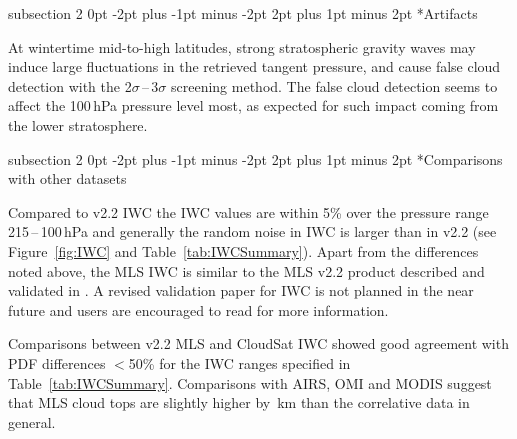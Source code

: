 \documentclass[11pt,draft]{report}
\makeatletter
\renewcommand{\subsection}{\@startsection%
  {subsection}%
  {2}%
  {0pt}%
  {-2pt plus -1pt minus -2pt}%
  {2pt plus 1pt minus 2pt}%
  {\large\sffamily\fontseries{sb}\selectfont\flushleft\color{SectionColor}\figureversion{tabular}}}%
\makeatother
\begin{document}
\subsection*{Artifacts}

At wintertime mid-to-high latitudes, strong stratospheric gravity waves
may induce large fluctuations in the retrieved tangent pressure, and
cause false cloud detection with the 2$\sigma$\,--\,3$\sigma$ screening
method. The false cloud detection seems to affect the 100\,hPa pressure
level most, as expected for such impact coming from the lower
stratosphere.

\subsection*{Comparisons with other datasets}

Compared to v2.2 IWC the \thisv IWC values are within 5\% over the
pressure range 215\,--\,100\,hPa and generally the random noise in
\thisv IWC is larger than in v2.2 (see Figure~\ref{fig:IWC} and
Table~\ref{tab:IWCSummary}).  Apart from the differences noted above,
the MLS \thisv IWC is similar to the MLS v2.2 product described and
validated in \citet{WuEtal08}.  A revised validation paper for IWC is
not planned in the near future and users are encouraged to read
\citet{WuEtal08} for more information.

Comparisons between v2.2 MLS and CloudSat IWC showed good agreement with
PDF differences $<$50\% for the IWC ranges specified in
Table~\ref{tab:IWCSummary}. Comparisons with AIRS, OMI and MODIS suggest
that MLS cloud tops are slightly higher by \,km than the
correlative data in general.
\end{document}
